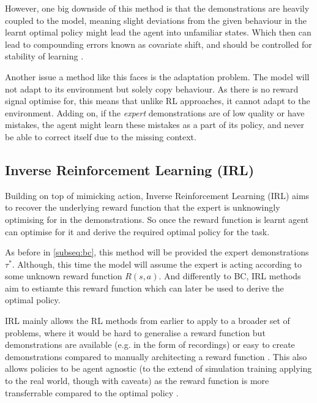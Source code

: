  However, one big downside of this method is that the demonstrations are heavily coupled to the model, meaning slight deviations from the given behaviour in the learnt optimal policy might lead the agent into unfamiliar states. Which then can lead to compounding errors known as covariate shift, and should be controlled for stability of learning \cite{mehta2024stablebccontrollingcovariateshift}. 
 \label{para:covariate-shift}
 
 Another issue a method like this faces is the adaptation problem. The model will not adapt to its environment but solely copy behaviour. As there is no reward signal optimise for, this means that unlike RL approaches, it cannot adapt to the environment. Adding on, if the \emph{expert} demonstrations are of low quality or have mistakes, the agent might learn these mistakes as a part of its policy, and never be able to correct itself due to the missing context.


\subsection{Inverse Reinforcement Learning (IRL)}
Building on top of mimicking action, Inverse Reinforcement Learning (IRL) aims to recover the underlying reward function that the expert is unknowingly optimising for in the demonstrations. So once the reward function is learnt agent can optimise for it and derive the required optimal policy for the task.

As before in \ref{subseq:bc}, this method will be provided the expert demonstrations $\tau^*$. Although, this time the model will assume the expert is acting according to some unknown reward function $R\left(s, a\right)$. And differently to BC, IRL methods aim to estiamte this reward function which can later be used to derive the optimal policy.



IRL mainly allows the RL methods from earlier to apply to a broader set of problems, where it would be hard to generalise a reward function but demonstrations are available (e.g. in the form of recordings) or easy to create demonstrations compared to manually architecting a reward function \cite{ARORA2021103500}. This also allows policies to be agent agnostic (to the extend of simulation training applying to the real world, though with caveats) as the reward function is more transferrable compared to the optimal policy \cite{russell1998learning}.


